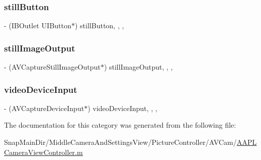 \hypertarget{category_a_a_p_l_camera_view_controller_07_08_a74d10026a7a46d06e678af46eea8c582}{}\label{category_a_a_p_l_camera_view_controller_07_08_a74d10026a7a46d06e678af46eea8c582} 
\subsubsection{\texorpdfstring{still\+Button}{stillButton}}
{\footnotesize\ttfamily -\/ (I\+B\+Outlet U\+I\+Button$\ast$) still\+Button\hspace{0.3cm}{\ttfamily [read]}, {\ttfamily [write]}, {\ttfamily [nonatomic]}, {\ttfamily [weak]}}

\hypertarget{category_a_a_p_l_camera_view_controller_07_08_a1befc1fbbfd7ff51c67dc90dd70721cc}{}\label{category_a_a_p_l_camera_view_controller_07_08_a1befc1fbbfd7ff51c67dc90dd70721cc} 
\subsubsection{\texorpdfstring{still\+Image\+Output}{stillImageOutput}}
{\footnotesize\ttfamily -\/ (A\+V\+Capture\+Still\+Image\+Output$\ast$) still\+Image\+Output\hspace{0.3cm}{\ttfamily [read]}, {\ttfamily [write]}, {\ttfamily [nonatomic]}, {\ttfamily [assign]}}

\hypertarget{category_a_a_p_l_camera_view_controller_07_08_a2103e56d25d443b453c3ddca2255e6ed}{}\label{category_a_a_p_l_camera_view_controller_07_08_a2103e56d25d443b453c3ddca2255e6ed} 
\subsubsection{\texorpdfstring{video\+Device\+Input}{videoDeviceInput}}
{\footnotesize\ttfamily -\/ (A\+V\+Capture\+Device\+Input$\ast$) video\+Device\+Input\hspace{0.3cm}{\ttfamily [read]}, {\ttfamily [write]}, {\ttfamily [nonatomic]}, {\ttfamily [assign]}}



The documentation for this category was generated from the following file\+:\begin{DoxyCompactItemize}
\item 
Snap\+Main\+Dir/\+Middle\+Camera\+And\+Settings\+View/\+Picture\+Controller/\+A\+V\+Cam/\hyperlink{_a_a_p_l_camera_view_controller_8m}{A\+A\+P\+L\+Camera\+View\+Controller.\+m}\end{DoxyCompactItemize}
